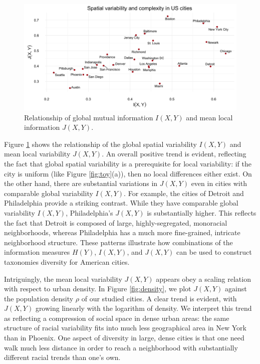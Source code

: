 \documentclass[english]{scrartcl}
\begin{document}
	\begin{figure}
		\includegraphics[width=1\textwidth]{figs/mutual_fisher.png}
		\caption{Relationship of global mutual information $I(X,Y)$ and mean local information $J(X,Y)$.} 
		\label{fig:info_cross}
	\end{figure}	
	Figure \ref{fig:info_cross} shows the relationship of the global spatial variability $I(X,Y)$ and mean local variability $J(X,Y)$. An overall positive trend is evident, reflecting the fact that global spatial variability is a prerequisite for local variability: if the city is uniform (like Figure \ref{fig:toy}(a)), then no local differences either exist.  On the other hand, there are substantial variations in $J(X,Y)$ even in cities with comparable global variability $I(X,Y)$. For example, the cities of Detroit and Philadelphia provide a striking contrast. While they have comparable global variability $I(X,Y)$, Philadelphia's $J(X,Y)$ is substantially higher. This reflects the fact that Detroit is composed of large, highly-segregated, monoracial neighborhoods, whereas Philadelphia has a much more fine-grained, intricate neighborhood structure. These patterns illustrate how combinations of the information measures $H(Y)$, $I(X,Y)$, and $J(X,Y)$ can be used to construct taxonomies diversity for American cities. 

	Intriguingly, the mean local variability $J(X,Y)$ appears obey a scaling relation with respect to urban density. In Figure \ref{fig:density}, we plot $J(X,Y)$ against the population density $\rho$ of our studied cities. A clear trend is evident, with $J(X,Y)$ growing linearly with the logarithm of density. We interpret this trend as reflecting a compression of social space in dense urban areas: the same structure of racial variability fits into much less geographical area in New York than in Phoenix. One aspect of diversity in large, dense cities is that one need walk much less distance in order to reach a neighborhood with substantially different racial trends than one's own. 
 
\end{document}
